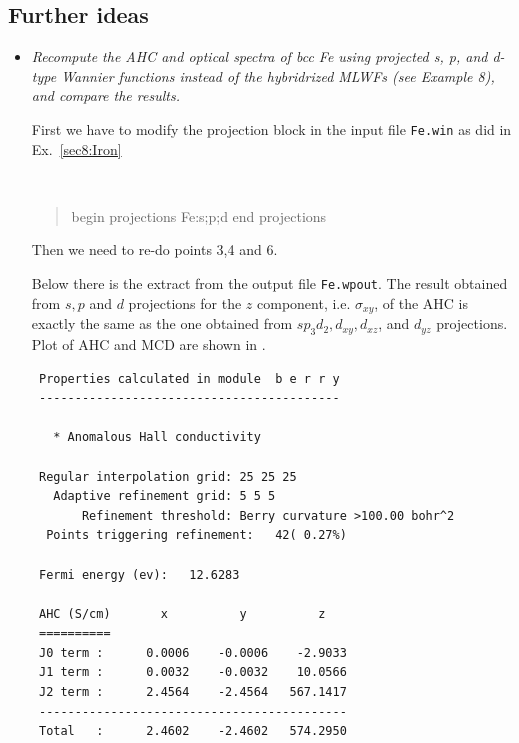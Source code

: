 \subsection*{Further ideas}
\begin{itemize}
	\item {\it Recompute the AHC and optical spectra of bcc Fe using projected s, p, and d-type Wannier
functions instead of the hybridrized MLWFs (see Example 8), and compare the results.}

First we have to modify the projection block in the input file {\tt Fe.win} as did in Ex.~\ref{sec8:Iron}

{\tt
\begin{quote}
begin projections
Fe:s;p;d
end projections
\end{quote}
}

Then we need to re-do points 3,4 and 6.

Below there is the extract from the output file {\tt Fe.wpout}. The result obtained from $s,p$ and $d$ projections for the $z$ component, i.e. $\sigma_{xy}$, of the AHC is exactly the same as the one obtained from $sp_3d_2,d_{xy},d_{xz}$, and $d_{yz}$ projections. Plot of AHC and MCD are shown in .
	{\small
	\begin{tcolorbox}[title=With adaptive refinement,sharp corners,boxrule=0.5pt]
	\begin{verbatim}
 Properties calculated in module  b e r r y
 ------------------------------------------

   * Anomalous Hall conductivity
  
 Regular interpolation grid: 25 25 25
   Adaptive refinement grid: 5 5 5
       Refinement threshold: Berry curvature >100.00 bohr^2
  Points triggering refinement:   42( 0.27%)

 Fermi energy (ev):   12.6283

 AHC (S/cm)       x          y          z
 ==========
 J0 term :      0.0006    -0.0006    -2.9033
 J1 term :      0.0032    -0.0032    10.0566
 J2 term :      2.4564    -2.4564   567.1417
 -------------------------------------------
 Total   :      2.4602    -2.4602   574.2950

	\end{verbatim}
	\end{tcolorbox}
	}


\end{itemize}

